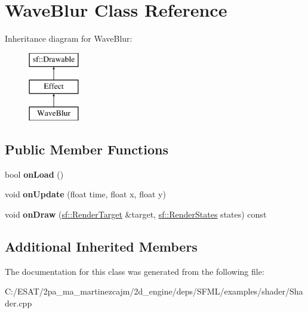 \hypertarget{class_wave_blur}{}\section{Wave\+Blur Class Reference}
\label{class_wave_blur}
Inheritance diagram for Wave\+Blur\+:\begin{figure}[H]
\begin{center}
\leavevmode
\includegraphics[height=3.000000cm]{class_wave_blur}
\end{center}
\end{figure}
\subsection*{Public Member Functions}
\begin{DoxyCompactItemize}
\item 
\mbox{\label{class_wave_blur_a7fea002e212a7bb88126b25b6bd57396}} 
bool {\bfseries on\+Load} ()
\item 
\mbox{\label{class_wave_blur_afbc71110feb1a9638b15be91bffd9ec6}} 
void {\bfseries on\+Update} (float time, float x, float y)
\item 
\mbox{\label{class_wave_blur_a49f4365ad9b266513aa82f39628ea2ef}} 
void {\bfseries on\+Draw} (\hyperlink{classsf_1_1_render_target}{sf\+::\+Render\+Target} \&target, \hyperlink{classsf_1_1_render_states}{sf\+::\+Render\+States} states) const
\end{DoxyCompactItemize}
\subsection*{Additional Inherited Members}


The documentation for this class was generated from the following file\+:\begin{DoxyCompactItemize}
\item 
C\+:/\+E\+S\+A\+T/2pa\+\_\+ma\+\_\+martinezcajm/2d\+\_\+engine/deps/\+S\+F\+M\+L/examples/shader/Shader.\+cpp\end{DoxyCompactItemize}
